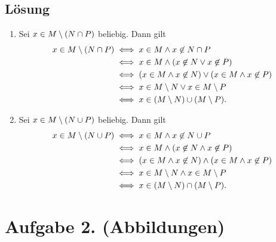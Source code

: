 \documentclass[german,12pt]{homework}
\DeclarePairedDelimiter{\enbrace}{(}{)}
\begin{document}
    \subsection*{Lösung}
    \begin{enumerate}
        \item Sei \(x \in M \setminus \enbrace*{N \cap P}\) beliebig. Dann gilt
        \begin{align*}
            x \in M \setminus \enbrace*{N \cap P} &\iff x \in M \land x \not\in
            N \cap P\\
            &\iff x \in M \land \enbrace*{x \not\in N \lor x \not\in P}\\
            &\iff \enbrace*{x \in M \land x \not\in N} \lor \enbrace*{x \in M
            \land x \not\in P}\\
            &\iff x \in M \setminus N \lor x \in M \setminus P\\
            &\iff x \in \enbrace*{M \setminus N} \cup \enbrace*{M \setminus P}.
        \end{align*}
        \item Sei \(x \in M \setminus \enbrace*{N \cup P}\) beliebig. Dann gilt
        \begin{align*}
            x \in M \setminus \enbrace*{N \cup P} &\iff x \in M \land x \not\in
            N \cup P\\
            &\iff x \in M \land \enbrace*{x \not\in N \land x \not\in P}\\
            &\iff \enbrace*{x \in M \land x \not\in N} \land \enbrace*{x \in M
            \land x \not\in P}\\
            &\iff x \in M \setminus N \land x \in M \setminus P\\
            &\iff x \in \enbrace*{M \setminus N} \cap \enbrace*{M \setminus P}.
        \end{align*}
    \end{enumerate}

    \section*{Aufgabe 2. (Abbildungen)}
\end{document}
